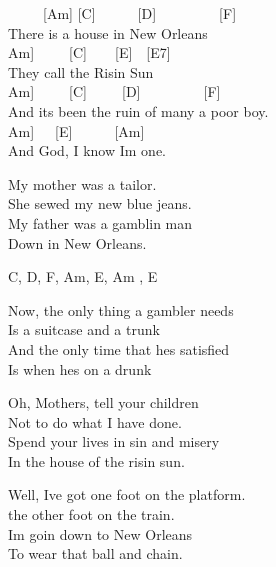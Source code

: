 \documentclass[
  letterpaper,
  twoside=false]{scrbook}
\begin{document}
~~~~~{[}Am{]} {[}C{]}~~~~~~{[}D{]}~~~~~~~~~{[}F{]}\\
There is a house in New Orleans\\
\hspace*{0.333em}\hspace*{0.333em}\hspace*{0.333em}\hspace*{0.333em}{[}Am{]}~~~~~{[}C{]}~~~~{[}E{]}~~{[}E7{]}\\
They call the Risin\textquotesingle{} Sun\\
\hspace*{0.333em}\hspace*{0.333em}\hspace*{0.333em}\hspace*{0.333em}\hspace*{0.333em}\hspace*{0.333em}\hspace*{0.333em}\hspace*{0.333em}{[}Am{]}~~~~~{[}C{]}~~~~~{[}D{]}~~~~~~~~~{[}F{]}\\
And it\textquotesingle s been the ruin of many a poor boy.\\
\hspace*{0.333em}\hspace*{0.333em}\hspace*{0.333em}{[}Am{]}~~~{[}E{]}~~~~~~{[}Am{]}\\
And God, I know I\textquotesingle m one.

My mother was a tailor.\\
She sewed my new blue jeans.\\
My father was a gamblin\textquotesingle{} man\\
Down in New Orleans.

C, D, F, Am, E, Am , E

Now, the only thing a gambler needs\\
Is a suitcase and a trunk\\
And the only time that he\textquotesingle s satisfied\\
Is when he\textquotesingle s on a drunk

Oh, Mothers, tell your children\\
Not to do what I have done.\\
Spend your lives in sin and misery\\
In the house of the risin\textquotesingle{} sun.

Well, I\textquotesingle ve got one foot on the platform.\\
the other foot on the train.\\
I\textquotesingle m goin\textquotesingle{} down to New Orleans\\
To wear that ball and chain.
\end{document}
